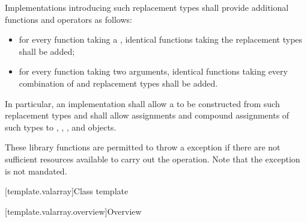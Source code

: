 \pnum
Implementations introducing such replacement types shall provide
additional functions and operators as follows:
\begin{itemize}
\item
for every function taking a
,
identical functions taking the replacement types shall be added;
\item
for every function taking two
arguments, identical functions taking every combination of
and replacement types shall be added.
\end{itemize}

\pnum
In particular, an implementation shall allow a
to be constructed from such replacement types and shall allow assignments
and compound assignments of such types to
,
,
,
and
objects.

\pnum
These library functions are permitted to throw a
 exception if there are not sufficient resources available
to carry out the operation.
Note that the exception is not mandated.

[template.valarray]{Class template }

[template.valarray.overview]{Overview}

